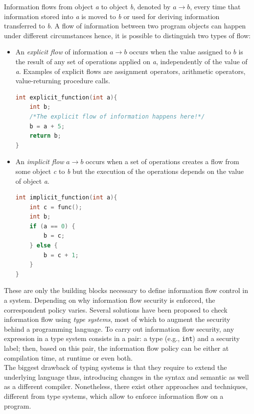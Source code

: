 \documentclass[LaM,binding=0.6cm]{sapthesis}
\begin{document}
Information flows from object \textit{a} to object \textit{b}, denoted by $a \rightarrow b$, every time that information stored into \textit{a} is moved to \textit{b} or used for deriving information transferred to \textit{b}. A flow of information between two program objects can happen under different circumstances hence, it is possible to distinguish two types of flow:
\begin{itemize}
\item An \textit{explicit flow} of information $a \rightarrow b$ occurs when the value assigned to $b$ is the result of any set of operations applied on \textit{a}, independently of the value of \textit{a}. Examples of explicit flows are assignment operators, arithmetic operators, value-returning procedure calls.
\begin{lstlisting}[language=C++, caption=Example of explicit flow where the value of variable \texttt{b} is the result of an addition operation involving variable \texttt{a}.]
int explicit_function(int a){
	int b;
	/*The explicit flow of information happens here!*/
	b = a + 5;
	return b;
}
\end{lstlisting}
\item An \textit{implicit flow} $a \rightarrow b$ occurs when a set of operations creates a flow from some object \textit{c} to \textit{b} but the execution of the operations depends on the value of object \textit{a}.
\begin{lstlisting}[language=C++, caption=Example of implicit flow where the value assumed by variable \texttt{b} depends on the actual value of variable \texttt{a}.]
int implicit_function(int a){
	int c = func();
	int b;
	if (a == 0) {
		b = c;
	} else {
		b = c + 1;
	}
}
\end{lstlisting}
\end{itemize}
These are only the building blocks necessary to define information flow control in a system. Depending on why information flow security is enforced, the correspondent policy varies. Several solutions have been proposed to check information flow using \textit{type systems}, most of which to augment the security behind a programming language\cite{malecha2010more}. To carry out information flow security, any expression in a type system consists in a pair: a type (e.g., \texttt{int}) and a security label; then, based on this pair, the information flow policy can be either at compilation time, at runtime or even both\cite{sabelfeld2003language}.\\
The biggest drawback of typing systems is that they require to extend the underlying language thus, introducing changes in the syntax and semantic as well as a different compiler. Nonetheless, there exist other approaches and techniques, different from type systems, which allow to enforce information flow on a program.
\end{document}
